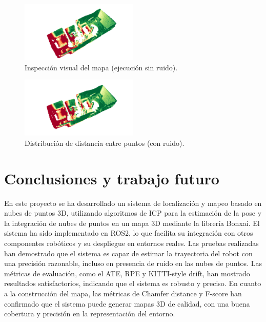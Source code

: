 \documentclass[12pt, a4paper, twoside]{article}
\begin{document}
\begin{figure}[h]
  \centering
    \includegraphics[width=0.5\textwidth]{map_clean.png}
  \caption{Inspección visual del mapa (ejecución sin ruido).}
\end{figure} 

\begin{figure}[h]
  \centering
    \includegraphics[width=0.5\textwidth]{map_noisy.png}
  \caption{Distribución de distancia entre puntos (con ruido).}
\end{figure} 

\section{Conclusiones y trabajo futuro}
En este proyecto se ha desarrollado un sistema de localización y mapeo basado en nubes de puntos 3D, utilizando algoritmos de ICP para la estimación de la pose y la integración de nubes de puntos en un mapa 
3D mediante la librería Bonxai. El sistema ha sido implementado en ROS2, lo que facilita su integración con otros componentes robóticos y su despliegue en entornos reales.\newline
Las pruebas realizadas han demostrado que el sistema es capaz de estimar la trayectoria del robot con una precisión razonable, incluso en presencia de ruido en las nubes de puntos. Las métricas de
evaluación, como el ATE, RPE y KITTI-style drift, han mostrado resultados satisfactorios, indicando que el sistema es robusto y preciso.\newline
En cuanto a la construcción del mapa, las métricas de Chamfer distance y F-score han confirmado que el sistema puede generar mapas 3D de calidad, con una buena cobertura y precisión en la 
representación del entorno.\newline
\end{document}
